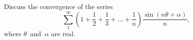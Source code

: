 Discuss the convergence of the series
\[
\sum_{1}^{\infty} \left(1 + \frac{1}{2} + \frac{1}{3} + \dots + \frac{1}{n}\right)
  \frac{\sin(n\theta + \alpha)}{n},
\]
where $\theta$~and~$\alpha$ are real. 

